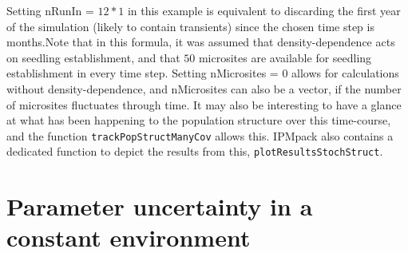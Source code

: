 \documentclass{article}
\begin{document}
Setting nRunIn = $12*1$ in this example is equivalent to discarding the first 
year of the simulation (likely to contain transients) since the chosen time step
is months.Note that in this formula, it was assumed that density-dependence acts on
seedling establishment, and that $50$ microsites are available for seedling establishment in every time step. Setting nMicrosites = $0$ allows for calculations without density-dependence, and nMicrosites can also be a vector, if the number of microsites fluctuates through time. It may also be interesting to have a glance at what has been happening to the population structure over this time-course, and the function {\tt trackPopStructManyCov} allows this. IPMpack also contains a dedicated function to depict the results from this, {\tt plotResultsStochStruct}.


\section{Parameter uncertainty in a constant environment}
\end{document}
